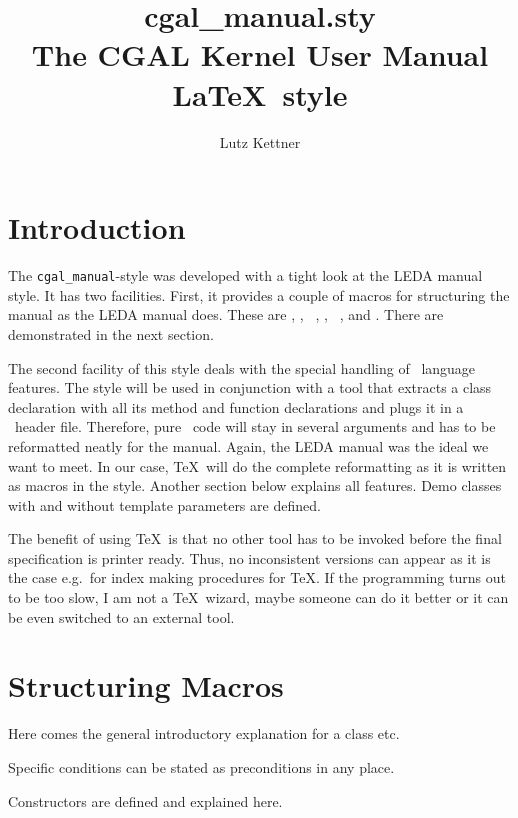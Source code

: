 \documentclass[12pt]{article}
\title {cgal\_manual.sty\\
        The CGAL Kernel User Manual \LaTeX\ style\\
        \vspace{5mm}
        \CCrevision}
\author{Lutz Kettner}
\date{\CCdate}
\begin{document}
\maketitle

\section{Introduction}

The {\tt cgal\_manual}-style was developed with a tight look at the
LEDA manual style. It has two facilities. First, it provides a couple
of macros for structuring the manual as the LEDA manual does. These
are {\tt \string{}}, {\tt \string\creation}, {\tt
  \string\operations}, {\tt \string\implementation}, {\tt
  \string\example}, and {\tt \string\precond}. There are demonstrated
in the next section.

The second facility of this style deals with the special handling of
\CC\ language features. The style will be used in conjunction with a
tool that extracts a class declaration with all its method and
function declarations and plugs it in a \CC\ header file. Therefore,
pure \CC\ code will stay in several arguments and has to be
reformatted neatly for the manual. Again, the LEDA manual was the
ideal we want to meet. In our case, \TeX\ will do the complete
reformatting as it is written as macros in the style. Another
section below explains all features. Demo classes with and without
template parameters are defined.

The benefit of using \TeX\ is that no other tool has to be invoked
before the final specification is printer ready. Thus, no inconsistent
versions can appear as it is the case e.g.\ for index making
procedures for \TeX. If the programming turns out to be too slow, I am
not a \TeX\ wizard, maybe someone can do it better or it can be even
switched to an external tool.

\section{Structuring Macros}

 Here comes the general introductory explanation for a
class etc.

\precond Specific conditions can be stated as preconditions in any place.

\creation Constructors are defined and explained here.
\end{document}

